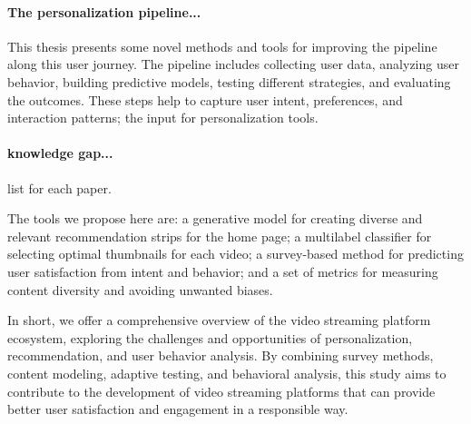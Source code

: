 \paragraph{The personalization pipeline...}
This thesis presents some novel methods and tools for improving the pipeline along this user journey. The pipeline includes collecting user data, analyzing user behavior, building predictive models, testing different strategies, and evaluating the outcomes. These steps help to capture user intent, preferences, and interaction patterns; the input for personalization tools.

\paragraph{knowledge gap...} list for each paper.

The tools we propose here are: a generative model for creating diverse and relevant recommendation strips for the home page; a multilabel classifier for selecting optimal thumbnails for each video; a survey-based method for predicting user satisfaction from intent and behavior; and a set of metrics for measuring content diversity and avoiding unwanted biases.

In short, we offer a comprehensive overview of the video streaming platform ecosystem, exploring the challenges and opportunities of personalization, recommendation, and user behavior analysis. By combining survey methods, content modeling, adaptive testing, and behavioral analysis, this study aims to contribute to the development of video streaming platforms that can provide better user satisfaction and engagement in a responsible way.









